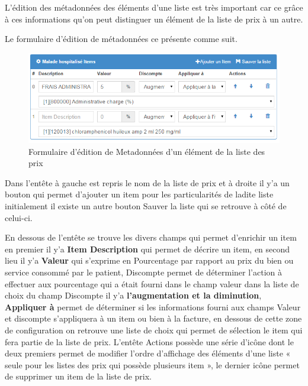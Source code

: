\documentclass[12pt,a4paper]{report}
\begin{document}
L'édition des métadonnées des éléments d'une liste est très important car ce grâce à ces informations qu'on peut distinguer un élément de la liste de prix à un autre.

Le formulaire d'édition de métadonnées ce présente comme suit.

\begin{figure}[h]
\begin{center}
\includegraphics[width=14cm]{pic/EditionMetaDonneListeP.png}
\end{center}
\caption{Formulaire d'édition de Metadonnées d'un élément de la liste des prix}
\label{Formulaire permettant de mettre à jour un élément de la liste de prix}
\end{figure}

Dans l'entête à gauche est repris le nom de la liste de prix et à droite il y'a un bouton qui permet d'ajouter un item pour les particularités de ladite liste initialement il existe un autre bouton Sauver la liste qui se retrouve à côté de celui-ci.

En dessous de l'entête se trouve les divers champs qui permet d'enrichir un item en premier il y'a \textbf{Item Description} qui permet de décrire un item, en second lieu il y'a \textbf{Valeur} qui s'exprime en Pourcentage par rapport au prix du bien ou service consommé par le patient, Discompte permet de déterminer l'action à effectuer aux pourcentage qui a était fourni dans le champ valeur dans la liste de choix du champ Discompte il y'a \textbf{l'augmentation et la diminution}, \textbf{Appliquer à} permet de déterminer si les informations fourni   aux champs Valeur et discompte s'appliquera à un item ou bien à la facture, en dessous de cette zone de configuration on retrouve une liste de choix qui permet de sélection le item qui fera partie de la liste de prix. L'entête Actions possède une série d'icône dont le deux premiers permet de modifier l'ordre d'affichage des éléments d'une liste « seule pour les listes des prix qui possède plusieurs item », le dernier icône permet de supprimer un item de la liste de prix.
\newpage
\end{document}
